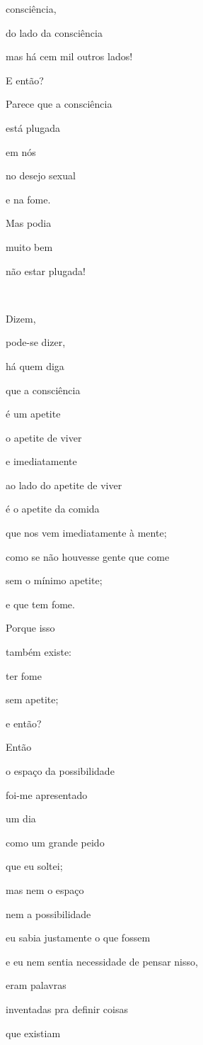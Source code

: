 consciência,

do lado da consciência

mas há cem mil outros lados!

E então?

Parece que a consciência

está plugada

em nós

no desejo sexual

e na fome.

Mas podia

muito bem

não estar plugada!~

~

Dizem, 

pode-se dizer, 

há quem diga

que a consciência

é um apetite

o apetite de viver

e imediatamente

ao lado do apetite de viver

é o apetite da comida

que nos vem imediatamente à mente;

como se não houvesse gente que come

sem o mínimo apetite;

e que tem fome.

Porque isso

também existe:

ter fome

sem apetite;

e então?


Então

o espaço da possibilidade

foi-me apresentado

um dia

como um grande peido \EP[1]

que eu soltei;

mas nem o espaço

nem a possibilidade

eu sabia justamente o que fossem

e eu nem sentia necessidade de pensar nisso,

eram palavras

inventadas pra definir coisas

que existiam

